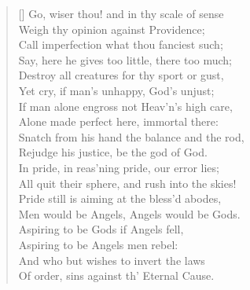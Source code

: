 \begin{verse}[\versewidth]
Go, wiser thou! and in thy scale of sense\\
Weigh thy opinion against Providence;\\
Call imperfection what thou fanciest such;\\
Say, here he gives too little, there too much;\\
Destroy all creatures for thy sport or gust,\\
Yet cry, if man's unhappy, God's unjust;\\
If man alone engross not Heav'n's high care,\\
Alone made perfect here, immortal there:\\
Snatch from his hand the balance and the rod,\\
Rejudge his justice, be the god of God.\\
In pride, in reas'ning pride, our error lies;\\
All quit their sphere, and rush into the skies!\\
Pride still is aiming at the bless'd abodes,\\
Men would be Angels, Angels would be Gods.\\
Aspiring to be Gods if Angels fell,\\
Aspiring to be Angels men rebel:\\
And who but wishes to invert the laws\\
Of order, sins against th' Eternal Cause.


\end{verse}
